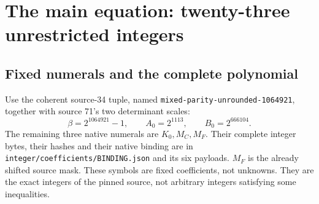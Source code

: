 \section{The main equation: twenty-three unrestricted integers}
\label{sec:integer}

\subsection{Fixed numerals and the complete polynomial}

Use the coherent source-34 tuple, named
\texttt{mixed-parity-unrounded-1064921}, together with source 71's two
determinant scales:
\[
 \beta=2^{1064921}-1,\qquad A_0=2^{1113},\qquad B_0=2^{666104}.
\]
The remaining three native numerals are $K_0,M_C,M_F$. Their complete
integer bytes, their hashes and their native binding are in
\texttt{integer/coefficients/BINDING.json} and its six payloads.
$M_F$ is the already shifted source mask. These symbols are fixed
coefficients, not unknowns. They are the exact integers of the pinned
source, not arbitrary integers satisfying some inequalities.

